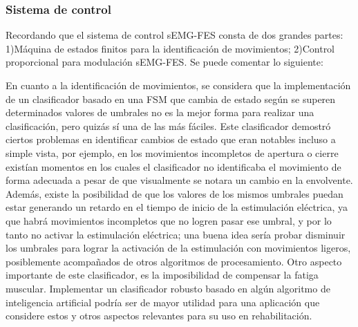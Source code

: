 \subsubsection*{Sistema de control}
Recordando que el sistema de control sEMG-FES consta de dos grandes partes: 1)Máquina de estados finitos para la identificación de movimientos; 2)Control proporcional para modulación sEMG-FES. Se puede comentar lo siguiente:


En cuanto a la identificación de movimientos, se considera que la implementación de un clasificador basado en una FSM que cambia de estado según se superen determinados valores de umbrales no es la mejor forma para realizar una clasificación, pero quizás sí una de las más fáciles. Este clasificador demostró ciertos problemas en identificar cambios de estado que eran notables incluso a simple vista, por ejemplo, en los movimientos incompletos de apertura o cierre existían momentos en los cuales el clasificador no identificaba el movimiento de forma adecuada a pesar de que visualmente se notara un cambio en la envolvente. Además, existe la posibilidad de que los valores de los mismos umbrales puedan estar generando un retardo en el tiempo de inicio de la estimulación eléctrica, ya que habrá movimientos incompletos que no logren pasar ese umbral, y por lo tanto no activar la estimulación eléctrica; una buena idea sería probar disminuir los umbrales para lograr la activación de la estimulación con movimientos ligeros, posiblemente acompañados de otros algoritmos de procesamiento. Otro aspecto importante de este clasificador, es la imposibilidad de compensar la fatiga muscular. Implementar un clasificador robusto basado en algún algoritmo de inteligencia artificial podría ser de mayor utilidad para una aplicación que considere estos y otros aspectos relevantes para su uso en rehabilitación.

